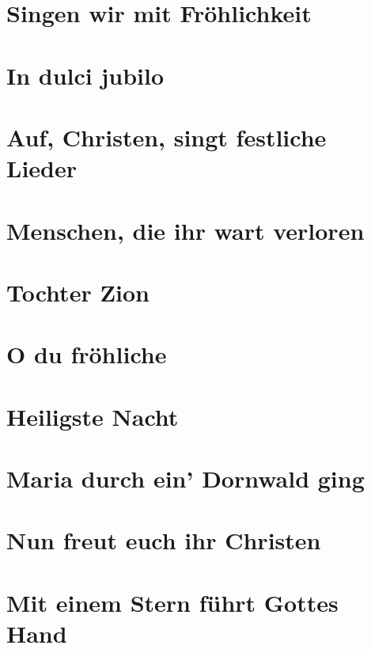 \documentclass[11pt]{article}
\begin{document}
\section{Singen wir mit Fröhlichkeit}

\section{In dulci jubilo}


\section{Auf, Christen, singt festliche Lieder}

\section{Menschen, die ihr wart verloren}

\section{Tochter Zion}

\section{O du fröhliche}

\section{Heiligste Nacht}

\section{Maria durch ein' Dornwald ging}

\section{Nun freut euch ihr Christen}

\section{Mit einem Stern führt Gottes Hand}
\end{document}
